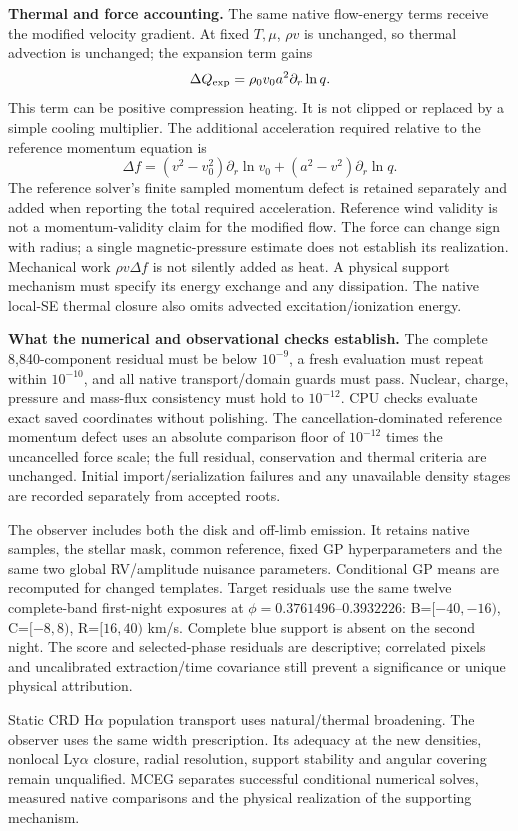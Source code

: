 \documentclass[10pt,a4paper]{article}
\begin{document}
\textbf{Thermal and force accounting.}
The same native flow-energy terms receive the modified velocity gradient.
At fixed $T,\mu$, $\rho v$ is unchanged, so thermal advection is unchanged;
the expansion term gains
\[
 \Delta Q_{\rm exp}=\rho_0v_0 a^2\partial_r\ln q.
\]
This term can be positive compression heating. It is not clipped or replaced
by a simple cooling multiplier. The additional acceleration required relative
to the reference momentum equation is
\[
 \Delta f=(v^2-v_0^2)\partial_r\ln v_0
              +(a^2-v^2)\partial_r\ln q.
\]
The reference solver's finite sampled momentum defect is retained separately
and added when reporting the total required acceleration. Reference wind
validity is not a momentum-validity claim for the modified flow. The force
can change sign with radius; a single magnetic-pressure estimate does not
establish its realization. Mechanical work $\rho v\Delta f$ is not silently
added as heat. A physical support mechanism must specify its energy exchange
and any dissipation. The native local-SE thermal closure also omits advected
excitation/ionization energy.

\textbf{What the numerical and observational checks establish.}
The complete 8,840-component residual must be below $10^{-9}$, a fresh
evaluation must repeat within $10^{-10}$, and all native transport/domain
guards must pass. Nuclear, charge, pressure and mass-flux consistency must
hold to $10^{-12}$. CPU checks evaluate exact saved coordinates without
polishing. The cancellation-dominated reference momentum defect uses an
absolute comparison floor of $10^{-12}$ times the uncancelled force scale;
the full residual, conservation and thermal criteria are unchanged.
Initial import/serialization failures and any unavailable density
stages are recorded separately from accepted roots.

The observer includes both the disk and off-limb emission. It retains native
samples, the stellar mask, common reference, fixed GP hyperparameters and
the same two global RV/amplitude nuisance parameters. Conditional GP means
are recomputed for changed templates. Target residuals use the same twelve
complete-band first-night exposures at $\phi=0.3761496$--$0.3932226$:
B=$[-40,-16)$, C=$[-8,8)$, R=$[16,40)$ km/s. Complete blue support is absent
on the second night. The score and selected-phase residuals are descriptive;
correlated pixels and uncalibrated extraction/time covariance still prevent
a significance or unique physical attribution.

Static CRD H$\alpha$ population transport uses natural/thermal broadening.
The observer uses the same width prescription.
Its adequacy at the new densities, nonlocal Ly$\alpha$ closure, radial
resolution, support stability and angular covering remain unqualified.
MCEG separates successful conditional numerical solves, measured native
comparisons and the physical realization of the supporting mechanism.
\end{document}
